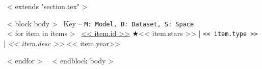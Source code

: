 ~< extends "section.tex" >~

~< block body >~
  \small{Key -- \texttt{M: Model, D: Dataset, S: Space}}\\
  ~< for item in items >~
    \href{<< item.repo_url >>}{<< item.id >>} $\bigstar$<< item.stars >> | \small{\texttt{<< item.type >>}} |
    \emph{<< item.desc >>} \hfill
    << item.year>> \par
  ~< endfor >~
~< endblock body >~
